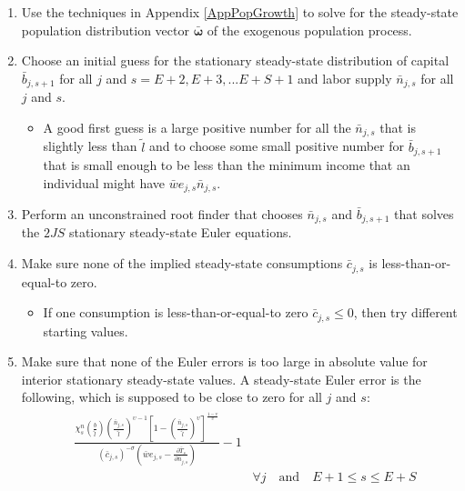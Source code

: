 \documentclass[letterpaper,12pt]{article}
\theoremstyle{definition}
\begin{document}
  \begin{enumerate}
    \item Use the techniques in Appendix \ref{AppPopGrowth} to solve for the steady-state population distribution vector $\bm{\bar{\omega}}$ of the exogenous population process.
    \item Choose an initial guess for the stationary steady-state distribution of capital $\bar{b}_{j,s+1}$ for all $j$ and $s=E+2,E+3,...E+S+1$ and labor supply $\bar{n}_{j,s}$ for all $j$ and $s$.
      \begin{itemize}
        \item A good first guess is a large positive number for all the $\bar{n}_{j,s}$ that is slightly less than $\tilde{l}$ and to choose some small positive number for $\bar{b}_{j,s+1}$ that is small enough to be less than the minimum income that an individual might have $\bar{w}e_{j,s}\bar{n}_{j,s}$.
      \end{itemize}
    \item Perform an unconstrained root finder that chooses $\bar{n}_{j,s}$ and $\bar{b}_{j,s+1}$ that solves the $2JS$ stationary steady-state Euler equations.
    \item Make sure none of the implied steady-state consumptions $\bar{c}_{j,s}$ is less-than-or-equal-to zero.
      \begin{itemize}
        \item If one consumption is less-than-or-equal-to zero $\bar{c}_{j,s}\leq 0$, then try different starting values.
      \end{itemize}
    \item Make sure that none of the Euler errors is too large in absolute value for interior stationary steady-state values. A steady-state Euler error is the following, which is supposed to be close to zero for all $j$ and $s$:
      \begin{align}
        \begin{split}
          &\frac{\chi^n_{s}\left(\frac{b}{\tilde{l}}\right)\left(\frac{\bar{n}_{j,s}}{\tilde{l}}\right)^{\upsilon-1}\left[1 - \left(\frac{\bar{n}_{j,s}}{\tilde{l}}\right)^\upsilon\right]^{\frac{1-\upsilon}{\upsilon}}}{(\bar{c}_{j,s})^{-\sigma}\left(\bar{w} e_{j,s} - \frac{\partial\bar{T}_{s}}{\partial \bar{n}_{j,s}}\right)} - 1 \\
          &\qquad\qquad\qquad\qquad\qquad\qquad\qquad\forall j\quad\text{and}\quad E+1\leq s\leq E+S
        \end{split} \label{EqSSeulerrLab} \\

\end{align}
\end{enumerate}
\end{document}
